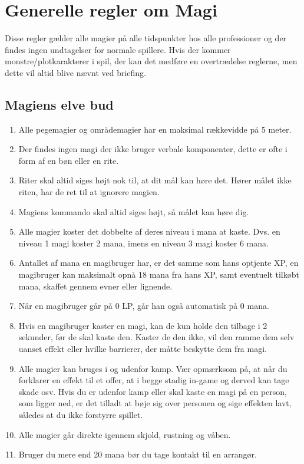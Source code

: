 \section*{Generelle regler om Magi}
Disse regler gælder alle magier på alle tidspunkter hos alle professioner og der findes ingen undtagelser for normale spillere. Hvis der kommer monstre/plotkarakterer i spil, der kan det medføre en overtrædelse reglerne, men dette vil altid blive nævnt ved briefing.\\
\subsection*{Magiens elve bud}
\begin{enumerate}
    \item Alle pegemagier og områdemagier har en maksimal rækkevidde på 5 meter.
    \item Der findes ingen magi der ikke bruger verbale komponenter, dette er ofte i form af en bøn eller en rite.
    \item Riter skal altid siges højt nok til, at dit mål kan høre det. Hører målet ikke riten, har de ret til at ignorere magien.
    \item Magiens kommando skal altid siges højt, så målet kan høre dig.
    \item Alle magier koster det dobbelte af deres niveau i mana at kaste. Dvs. en niveau 1 magi koster 2 mana, imens en niveau 3 magi koster 6 mana.
    \item Antallet af mana en magibruger har, er det samme som hans optjente XP, en magibruger kan maksimalt opnå 18 mana fra hans XP, samt eventuelt tilkøbt mana, skaffet gennem evner eller lignende. 
    \item Når en magibruger går på 0 LP, går han også automatisk på 0 mana.
    \item Hvis en magibruger kaster en magi, kan de kun holde den tilbage i 2 sekunder, før de skal kaste den. Kaster de den ikke, vil den ramme dem selv uanset effekt eller hvilke barrierer, der måtte beskytte dem fra magi.
    \item Alle magier kan bruges i og udenfor kamp. Vær opmærksom på, at når du forklarer en effekt til et offer, at i begge stadig in-game og derved kan tage skade osv. Hvis du er udenfor kamp eller skal kaste en magi på en person, som ligger ned, er det tilladt at bøje sig over personen og sige effekten lavt, således at du ikke forstyrre spillet.
    \item Alle magier går direkte igennem skjold, rustning og våben.
    \item Bruger du mere end 20 mana bør du tage kontakt til en arrangør.
\end{enumerate}

